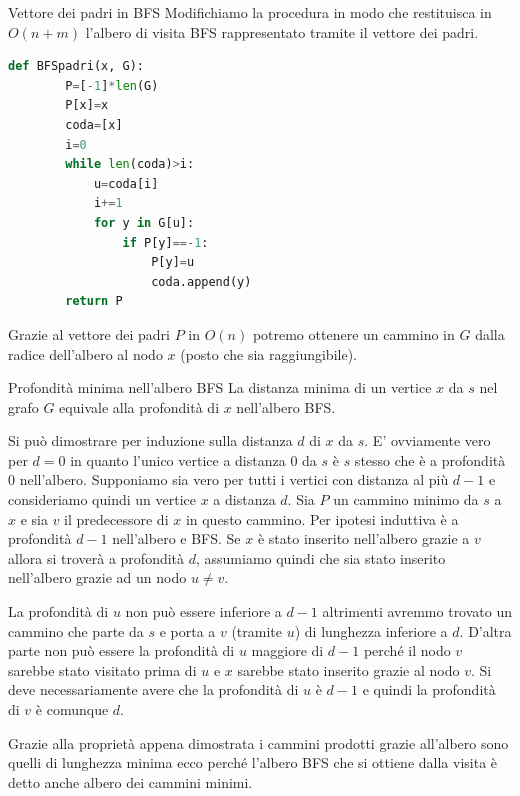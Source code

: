 \begin{Algoritmo}{Vettore dei padri in BFS}{}
    Modifichiamo la procedura in modo che restituisca in $O(n+m)$ l'albero di visita BFS rappresentato tramite il vettore dei padri. 

    \begin{lstlisting}[language=Python]
    def BFSpadri(x, G):
        P=[-1]*len(G)
        P[x]=x
        coda=[x]
        i=0
        while len(coda)>i:
            u=coda[i]
            i+=1
            for y in G[u]:
                if P[y]==-1:
                    P[y]=u
                    coda.append(y)
        return P
    \end{lstlisting}

    Grazie al vettore dei padri $P$ in $O(n)$ potremo ottenere un cammino in $G$ dalla radice dell'albero al nodo $x$ (posto che  sia raggiungibile).
\end{Algoritmo}

\begin{Lemma}{Profondità minima nell'albero BFS}{}
    La distanza minima di un vertice $x$ da $s$ nel grafo $G$ equivale alla profondità di $x$ nell'albero BFS.
    \begin{demonstration}
    Si può dimostrare per induzione sulla distanza $d$ di $x$ da $s$. E' ovviamente vero per $d = 0$ in quanto l'unico vertice a distanza 0 da $s$ è $s$ stesso che è a profondità 0 nell'albero. Supponiamo sia vero per tutti i vertici con distanza al più $d-1$ e consideriamo quindi un vertice $x$ a distanza $d$. Sia $P$ un cammino minimo da $s$ a $x$ e sia $v$ il predecessore di $x$ in questo cammino. Per ipotesi induttiva è a profondità $d-1$ nell'albero e BFS. Se $x$ è stato inserito nell'albero grazie a $v$ allora si troverà a profondità $d$, assumiamo quindi che sia stato inserito nell'albero grazie ad un nodo $u\neq v$.

    La profondità di $u$ non può essere inferiore a $d-1$ altrimenti avremmo trovato un cammino che parte da $s$ e porta a $v$ (tramite $u$) di lunghezza inferiore a $d$. D'altra parte non può essere la profondità di $u$ maggiore di $d-1$ perché il nodo $v$ sarebbe stato visitato prima di $u$ e $x$ sarebbe stato inserito grazie al nodo $v$. Si deve necessariamente avere che la profondità di $u$ è $d-1$ e quindi la profondità di $v$ è comunque $d$.
    \end{demonstration}
    
    Grazie alla proprietà appena dimostrata i cammini prodotti grazie all'albero sono quelli di lunghezza minima ecco perché l'albero BFS che si ottiene dalla visita è detto anche albero dei cammini minimi.
\end{Lemma}

